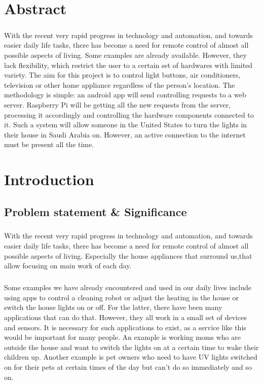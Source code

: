 \documentclass[12pt, oneside, a4paper]{book}
\newcommand{\mychapter}[1]{\newpage%
	\thispagestyle{empty}
	\topskip0pt%
	\vspace*{\fill}%
	\addtocounter{chapter}{1}%
	\begin{center}%
		\textbf{\Large{\color{chapter}{CHAPTER NO. \thechapter \\ \uppercase{#1}}}}%
	\end{center}%
	\vspace*{\fill}%
	\addtocounter{chapter}{-1}
	\newpage%
	\chapter{#1}
}
\begin{document}
	\chapter*{Abstract}
		\label{sec:intro}
		\paragraph{} With the recent very rapid progress in technology and automation, and towards easier daily life tasks, there has
		become a need for remote control of almost all possible aspects of living. Some examples are already available. However, they lack flexibility, which restrict the user to a certain set of hardwares with limited variety. The aim for this project is to control light buttons, air conditioners, television or other home appliance regardless of the person's location. The methodology is simple: an android app will send controlling requests to a web server. Raspberry Pi will be getting all the new requests from the server, processing it accordingly and controlling the hardware components connected to it. Such a system will allow someone in the United States to turn the lights in their house in Saudi Arabia on. However, an active connection to the internet must be present all the time. 
		
	

	\mychapter{Introduction}
		\section{Problem statement \& Significance}
		\paragraph{}With the recent very rapid progress in technology and automation, and towards easier daily life tasks, there has
		become a need for remote control of almost all possible aspects of living. Especially
		the house appliances that surround us,that allow focusing on main work of each day.
		\paragraph{}Some examples we have already encountered and used in our daily lives include using apps to control a cleaning robot or adjust the heating in the house or switch the house lights on or off. For the latter, there have been many applications that can do that. However, they all work in a small set of devices and sensors. It is necessary for such applications to exist, as a service like this would be important for many people. An example is working moms who are outside the house and want to switch the lights on at a certain time to wake their children up. Another example is pet owners who need to have UV lights switched on for their pets at certain times of the day but can’t do so immediately and so on. 
\end{document}
